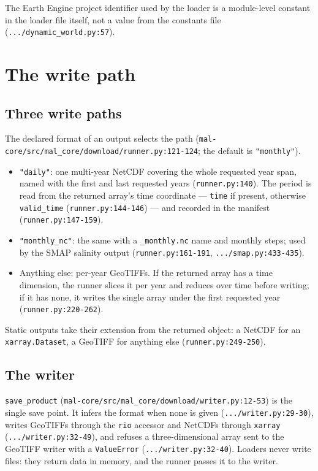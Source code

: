 \documentclass[11pt,a4paper]{article}
\newcommand{\code}[1]{\texttt{#1}}
\begin{document}
The Earth Engine project identifier used by the loader is a module-level
constant in the loader file itself, not a value from the constants file
(\code{.../dynamic\_world.py:57}).

\section{The write path}

\subsection{Three write paths}

The declared format of an output selects the path
(\code{mal-core/src/mal\_core/download/runner.py:121-124}; the default is
\code{"monthly"}).

\begin{itemize}
\item \code{"daily"}: one multi-year NetCDF covering the whole requested year
span, named with the first and last requested years (\code{runner.py:140}).
The period is read from the returned array's time coordinate --- \code{time}
if present, otherwise \code{valid\_time} (\code{runner.py:144-146}) --- and
recorded in the manifest (\code{runner.py:147-159}).
\item \code{"monthly\_nc"}: the same with a \code{\_monthly.nc} name and
monthly steps; used by the SMAP salinity output (\code{runner.py:161-191},
\code{.../smap.py:433-435}).
\item Anything else: per-year GeoTIFFs. If the returned array has a time
dimension, the runner slices it per year and reduces over time before
writing; if it has none, it writes the single array under the first requested
year (\code{runner.py:220-262}).
\end{itemize}

Static outputs take their extension from the returned object: a NetCDF for
an \code{xarray.Dataset}, a GeoTIFF for anything else
(\code{runner.py:249-250}).

\subsection{The writer}

\code{save\_product} (\code{mal-core/src/mal\_core/download/writer.py:12-53})
is the single save point. It infers the format when none is given
(\code{.../writer.py:29-30}), writes GeoTIFFs through the \code{rio} accessor
and NetCDFs through \code{xarray}
(\code{.../writer.py:32-49}), and refuses a three-dimensional array sent to
the GeoTIFF writer with a \code{ValueError}
(\code{.../writer.py:32-40}). Loaders never write files: they return data in
memory, and the runner passes it to the writer.
\end{document}
